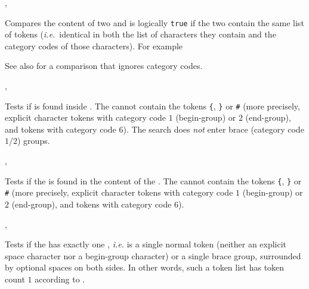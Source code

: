 \documentclass[oneside]{book}
\begin{document}
\begin{function}{\TlVarIfEq,\TlVarIfEqTF}
\begin{syntax}
  
    
\end{syntax}
Compares the content of two  and
is logically \texttt{true} if the two contain the same list of
tokens (\emph{i.e.}~identical in both the list of characters they
contain and the category codes of those characters). For example
\begin{demohigh}
\TlSet {}
\TlSet {}
\TlSet {}
\TlVarIfEqTF \lTmpaTl {} {}
\TlVarIfEqTF \lTmpaTl {} {}
\end{demohigh}
See also  for a comparison that ignores category codes.
\end{function}

\begin{function}{\TlIfIn,\TlIfInTF}
\begin{syntax}
  
    
\end{syntax}
Tests if  is found inside .
The  cannot contain the tokens \verb|{|, \verb|}| or \verb|#|
(more precisely, explicit character tokens with category code $1$
(begin-group) or $2$ (end-group), and tokens with category code $6$).
The search does \emph{not} enter brace (category code $1$/$2$) groups.
\end{function}

\begin{function}{\TlVarIfIn,\TlVarIfInTF}
\begin{syntax}
  
    
\end{syntax}
Tests if the  is found in the content of the
. The  cannot contain
the tokens \verb|{|, \verb|}| or \verb|#|
(more precisely, explicit character tokens with category code $1$
(begin-group) or $2$ (end-group), and tokens with category code $6$).
\end{function}

\begin{function}{\TlIfSingle,\TlIfSingleTF}
\begin{syntax}
 
   
\end{syntax}
Tests if the  has exactly one , \emph{i.e.} is
a single normal token (neither an explicit space character nor a
begin-group character) or a single brace group, surrounded by
optional spaces on both sides. In other words, such a token list has
token count $1$ according to .
\end{function}
\end{document}
